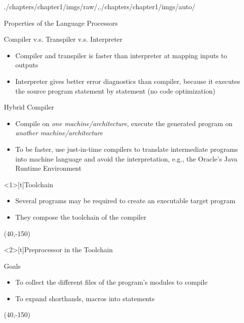 \begin{graphicspathcontext}{{./chapters/chapter1/imgs/raw/},{./chapters/chapter1/imgs/auto/}}
\begin{bibunit}[apalike]
\begin{frame}{Properties of the Language Processors}
	\begin{smaller}
	\begin{block}{Compiler v.s. Transpiler v.s. Interpreter}
	\begin{itemize}
	\item Compiler and transpiler is faster than interpreter at mapping inputs to outputs
	\item Interpreter gives better error diagnostics than compiler, because it executes the source program statement by statement (no code optimization)
	\end{itemize}
	\end{block}
	\vspace{1cm}
	\begin{block}{Hybrid Compiler}
	\begin{itemize}
	\item Compile on \emph{one machine/architecture}, execute the generated program on \emph{another machine/architecture}
	\item To be faster, use just-in-time compilers to translate intermediate programs into machine language and avoid the interpretation, e.g., the Oracle's Java Runtime Environment
	\end{itemize}
	\end{block}
	\end{smaller}
\end{frame}

\begin{frame}<1>[t]{Toolchain}
	\begin{itemize}
	\item Several programs may be required to create an executable target program
	\item They compose the toolchain of the compiler
	\end{itemize}
	\putat(40,-150){\includeanimatedfigure[width=.8\linewidth]{toolchain}}
\end{frame}

\begin{frame}<2>[t]{Preprocessor in the Toolchain}
	\begin{smaller}
	\begin{block}{\smaller Goals}
	\begin{itemize}
	\item To collect the different files of the program's modules to compile
	\item To expand shorthands, macros into statements
	\end{itemize}
	\end{block}
	\end{smaller}
	\putat(40,-150){}
\end{frame}


\end{bibunit}
\end{graphicspathcontext}
